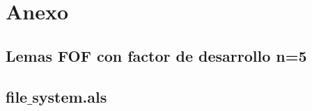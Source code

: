 \chapter{Anexo}

\section{Lemas FOF con factor de desarrollo n=5}
\label{anexo_lemas_fof}


\section{file$\_$system.als}
\label{anexo_fs}
